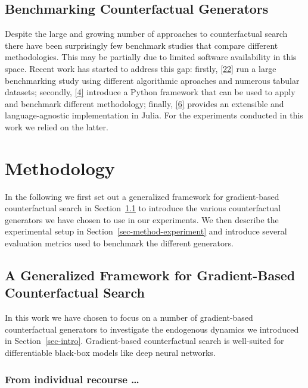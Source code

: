 \documentclass[
  conference]{IEEEtran}
\begin{document}
\hypertarget{sec-related-benchmark}{%
\subsection{Benchmarking Counterfactual
Generators}\label{sec-related-benchmark}}

Despite the large and growing number of approaches to counterfactual
search there have been surprisingly few benchmark studies that compare
different methodologies. This may be partially due to limited software
availability in this space. Recent work has started to address this gap:
firstly, \protect\hyperlink{ref-de2021framework}{{[}22{]}} run a large
benchmarking study using different algorithmic aproaches and numerous
tabular datasets; secondly,
\protect\hyperlink{ref-pawelczyk2021carla}{{[}4{]}} introduce a Python
framework that can be used to apply and benchmark different methodology;
finally,
\protect\hyperlink{ref-altmeyer2022CounterfactualExplanations}{{[}6{]}}
provides an extensible and language-agnostic implementation in Julia.
For the experiments conducted in this work we relied on the latter.

\hypertarget{sec-method}{%
\section{Methodology}\label{sec-method}}

In the following we first set out a generalized framework for
gradient-based counterfactual search in Section~\ref{sec-method-general}
to introduce the various counterfactual generators we have chosen to use
in our experiments. We then describe the experimental setup in
Section~\ref{sec-method-experiment} and introduce several evaluation
metrics used to benchmark the different generators.

\hypertarget{sec-method-general}{%
\subsection{A Generalized Framework for Gradient-Based Counterfactual
Search}\label{sec-method-general}}

In this work we have chosen to focus on a number of gradient-based
counterfactual generators to investigate the endogenous dynamics we
introduced in Section~\ref{sec-intro}. Gradient-based counterfactual
search is well-suited for differentiable black-box models like deep
neural networks.

\hypertarget{from-individual-recourse}{%
\subsubsection{From individual recourse
\ldots{}}\label{from-individual-recourse}}
\end{document}

